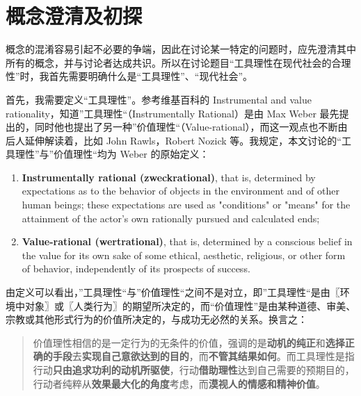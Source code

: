 \section{概念澄清及初探}
概念的混淆容易引起不必要的争端，因此在讨论某一特定的问题时，应先澄清其中所有的概念，并与讨论者达成共识。所以在讨论题目“工具理性在现代社会的合理性”时，我首先需要明确什么是“工具理性”、“现代社会”。

首先，我需要定义“工具理性”。参考维基百科的 Instrumental and value rationality\cite{wiki2019instrumental_rationality}，知道”工具理性“（Instrumentally Rational）是由 Max Weber 最先提出的，同时他也提出了另一种”价值理性“（Value-rational），而这一观点也不断由后人延伸解读着，比如 John Rawls，Robert Nozick 等。我规定，本文讨论的“工具理性”与”价值理性“均为 Weber 的原始定义：
\begin{enumerate}
    \item \textbf{Instrumentally rational (zweckrational)}, that is, determined by expectations as to the behavior of objects in the environment and of other human beings; these expectations are used as "conditions" or "means" for the attainment of the actor's own rationally pursued and calculated ends;
    \item \textbf{Value-rational (wertrational)}, that is, determined by a conscious belief in the value for its own sake of some ethical, aesthetic, religious, or other form of behavior, independently of its prospects of success.
\end{enumerate}
由定义可以看出，”工具理性“与”价值理性“之间不是对立，即”工具理性“是由〖环境中对象〗或〖人类行为〗的期望所决定的，而“价值理性”是由某种道德、审美、宗教或其他形式行为的价值所决定的，与成功无必然的关系。换言之：
\begin{quotation}
    价值理性相信的是一定行为的无条件的价值，强调的是\textbf{动机的纯正}和\textbf{选择正确的手段}去\textbf{实现自己意欲达到的目的}，而\textbf{不管其结果如何}。而工具理性是指行动\textbf{只由追求功利的动机所驱使}，行动\textbf{借助理性}达到自己需要的预期目的，行动者纯粹从\textbf{效果最大化的角度}考虑，而\textbf{漠视人的情感和精神价值}。\cite{mba2019工具理性}
\end{quotation}

